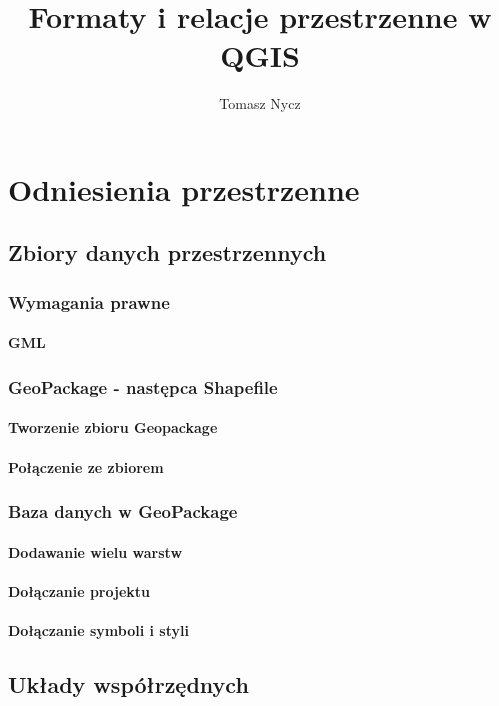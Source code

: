 \documentclass[a4paper,11pt, onecolumn, openany]{memoir}
\author{Tomasz Nycz}
\title{Formaty i relacje przestrzenne w QGIS}
\begin{document}
	
	\frontmatter
	
	\maketitle


\mainmatter
\part{Odniesienia przestrzenne}
	\chapter{Zbiory danych przestrzennych}
		\section{Wymagania prawne}
			\subsection{GML}
		\section{GeoPackage - następca Shapefile}
			\subsection{Tworzenie zbioru Geopackage}
			\subsection{Połączenie ze zbiorem}
		\section{Baza danych w GeoPackage}
			\subsection{Dodawanie wielu warstw}
			\subsection{Dołączanie projektu}
			\subsection{Dołączanie symboli i styli}		

	\chapter{Układy współrzędnych}
\end{document}
